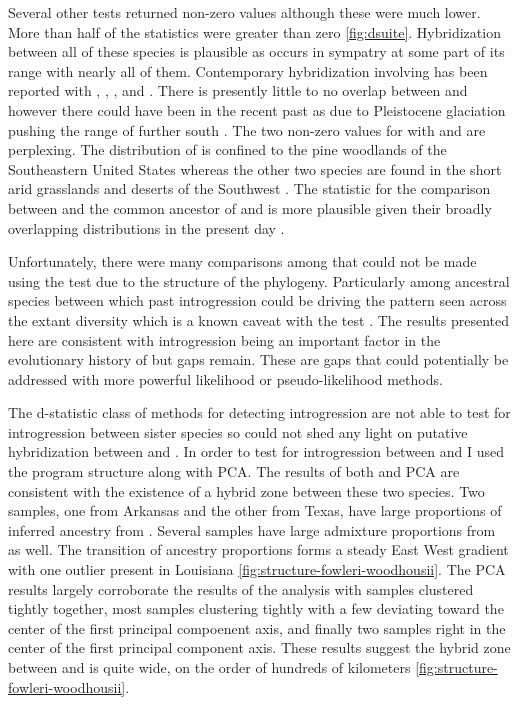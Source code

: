 Several other \fbranch tests returned non-zero values although these were much
lower.
More than half of the \wood \fbranch statistics were greater than zero \amer \cref{fig:dsuite}.
Hybridization between all of these species is plausible as \wood occurs in 
sympatry at some part of its range with nearly all of them. 
Contemporary hybridization involving \wood has been reported with \amer, 
\cognatus, \microscaphus, and \speciosus \parencite{sullivan1986}. 
There is presently little to no overlap between \wood and \hemiophrys however
there could have been in the recent past as due to Pleistocene glaciation  
pushing the range of \hemiophrys further south \parencite{henrich1968}. 
The two non-zero \fbranch values for \quercicus with \punctatus and \speciosus 
are perplexing.  
The distribution of \quercicus is confined to the pine woodlands of the 
Southeastern United States whereas the other two species are found in the  
short arid grasslands and deserts of the Southwest \parencite{conant1998}. 
The \fbranch statistic for the comparison between \punctatus and the common 
ancestor of \speciosus and \cognatus is more plausible given their broadly
overlapping distributions in the present day \parencite{conant1998}.

Unfortunately, there were many comparisons among \anaxyrus that could not be 
made using the \fbranch test due to the structure of the phylogeny. 
Particularly among ancestral species between which past introgression could
be driving the pattern seen across the extant diversity which is a known 
caveat with the \fbranch test \parencite{malinsky2021}.
The results presented here are consistent with introgression being an 
important factor in the evolutionary history of \anaxyrus but gaps remain.
These are gaps that could potentially be addressed with more powerful 
likelihood or pseudo-likelihood methods. 

The d-statistic class of methods for detecting introgression are not able to   
test for introgression between sister species so could not shed any light 
on putative hybridization between \fowl and \wood. 
In order to test for introgression between \fowl and \wood I used the program 
structure along with PCA.  
The results of both \structure and PCA are consistent with the existence of  
a hybrid zone between these two species.
Two \wood samples, one from Arkansas and the other from Texas, have large proportions 
of inferred ancestry from \fowl. 
Several \fowl samples have large admixture proportions from \wood as well.  
The transition of ancestry proportions forms a steady East West gradient with 
one outlier present in Louisiana \cref{fig:structure-fowleri-woodhousii}.
The PCA results largely corroborate the results of the \structure analysis with 
\wood samples clustered tightly together, most \fowl samples clustering tightly
with a few deviating toward the center of the first principal compoenent axis, 
and finally two samples right in the center of the first principal component axis.
These results suggest the hybrid zone between \fowl and \wood is quite wide, on 
the order of hundreds of kilometers \cref{fig:structure-fowleri-woodhousii}.

